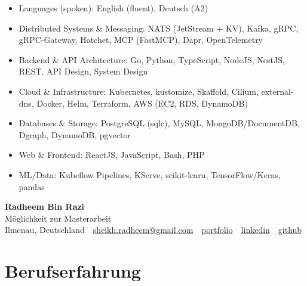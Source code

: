 \documentclass[10pt,a4paper]{resume}
\makeatletter
\newcommand{\Portfolio}{https://radheem.github.io/my-cv}
\newcommand{\PortfolioText}{portfolio}
\newcommand{\GitHub}{https://github.com/radheem}
\newcommand{\LinkedIn}{https://www.linkedin.com/in/radheem-razi}
\newcommand{\Email}{sheikh.radheem@gmail.com}
\makeatother
\begin{document}
\begin{itemize}[leftmargin=1.4em,nosep,topsep=2pt]
  \item Languages (spoken): English (fluent), Deutsch (A2)
  \item Distributed Systems \& Messaging: NATS (JetStream + KV), Kafka, gRPC, gRPC-Gateway, Hatchet, MCP (FastMCP), Dapr, OpenTelemetry
  \item Backend \& API Architecture: Go, Python, TypeScript, NodeJS, NestJS, REST, API Design, System Design
  \item Cloud \& Infrastructure: Kubernetes, kustomize, Skaffold, Cilium, external-dns, Docker, Helm, Terraform, AWS (EC2, RDS, DynamoDB)
  \item Databases \& Storage: PostgreSQL (sqlc), MySQL, MongoDB/DocumentDB, Dgraph, DynamoDB, pgvector
  \item Web \& Frontend: ReactJS, JavaScript, Bash, PHP
  \item ML/Data: Kubeflow Pipelines, KServe, scikit-learn, TensorFlow/Keras, pandas
\end{itemize}

\clearpage
{}

\begin{center}
  {\huge\bfseries Radheem Bin Razi}\\[3pt]
  {\large Möglichkeit zur Masterarbeit}\\[6pt]
  \small
  Ilmenau, Deutschland \,\textbar\,
  \href{mailto:\Email}{\Email} \,\textbar\,
  \href{\Portfolio}{\PortfolioText} \,\textbar\,
  \href{\LinkedIn}{linkedin} \,\textbar\,
  \href{\GitHub}{github}
\end{center}
\vspace{2pt}

\section{Berufserfahrung}
\end{document}
